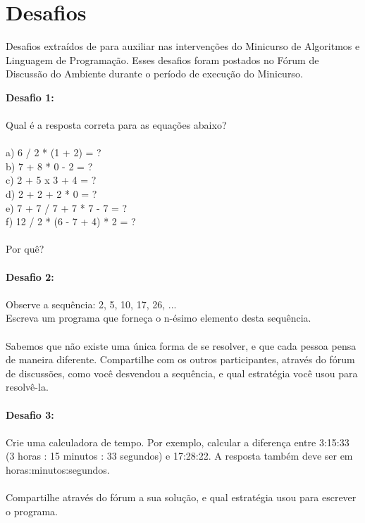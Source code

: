 \chapter{Desafios}\label{ane:desafios}

Desafios extraídos de  para auxiliar nas intervenções do Minicurso de Algoritmos e Linguagem de
Programação. Esses desafios foram postados no Fórum de Discussão do Ambiente \adaptwebspace durante o período de execução
do Minicurso.

\noindent
\textbf{Desafio 1:} \\
\\
Qual é a resposta correta para as equações abaixo?\\
\\
a) 6 / 2 * (1 + 2) = ?\\
b) 7 + 8 * 0 - 2 = ?\\
c) 2 + 5 x 3 + 4 = ?\\
d) 2 + 2 + 2 * 0 = ?\\
e) 7 + 7 / 7 + 7 * 7 - 7 = ?\\
f) 12 / 2 * (6 - 7 + 4) * 2 = ?\\
\\
Por quê?\\
\\
\textbf{Desafio 2:} \\
\\
Observe a sequência: 2, 5, 10, 17, 26, ... \\
Escreva um programa que forneça o n-ésimo elemento desta sequência.\\
\\
Sabemos que não existe uma única forma de se resolver, e que cada pessoa pensa de maneira diferente. Compartilhe com os
outros participantes, através do fórum de discussões, como você desvendou a sequência, e qual estratégia você usou para
resolvê-la.\\
\\
\textbf{Desafio 3:} \\
\\
Crie uma calculadora de tempo. Por exemplo, calcular a diferença entre 3:15:33 (3 horas : 15 minutos : 33 segundos) e
17:28:22. A resposta também deve ser em horas:minutos:segundos.\\
\\
Compartilhe através do fórum a sua solução, e qual estratégia usou para escrever o programa.\\
